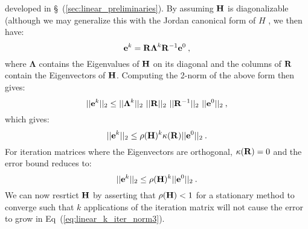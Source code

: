 developed in \S~(\ref{sec:linear_preliminaries}). By assuming $\mathbf{H}$
is diagonalizable (although we may generalize this with the Jordan
canonical form of $H$ \citep{saad_2003}, we then have:
\begin{equation}
  \mathbf{e}^{k} =
  \mathbf{R}\boldsymbol{\Lambda}^k\mathbf{R}^{-1}\mathbf{e}^0\:,
  \label{eq:linear_k_iter_error_diag}
\end{equation}
where $\boldsymbol{\Lambda}$ contains the Eigenvalues of $\mathbf{H}$ on
its diagonal and the columns of $\mathbf{R}$ contain the Eigenvectors of
$\mathbf{H}$. Computing the 2-norm of the above form then gives:
\begin{equation}
  ||\ve{e}^{k}||_2 \leq ||\boldsymbol{\Lambda}^k||_2\ 
  ||\ve{R}||_2\ ||\ve{R}^{-1}||_2\ ||\ve{e}^0||_2\:,
  \label{eq:linear_k_iter_norm1}
\end{equation}
which gives:
\begin{equation}
  ||\mathbf{e}^{k}||_2 \leq \rho(\mathbf{H})^k \kappa(\mathbf{R})
  ||\mathbf{e}^0||_2\:.
  \label{eq:linear_k_iter_norm2}
\end{equation}
For iteration matrices where the Eigenvectors are orthogonal,
$\kappa(\mathbf{R})=0$ and the error bound reduces to:
\begin{equation}
  ||\mathbf{e}^{k}||_2 \leq \rho(\mathbf{H})^k
  ||\mathbf{e}^0||_2\:.
  \label{eq:linear_k_iter_norm3}
\end{equation}
We can now resrtict $\mathbf{H}$ by asserting that $\rho(\mathbf{H}) < 1$
for a stationary method to converge such that $k$ applications of the
iteration matrix will not cause the error to grow in
Eq~(\ref{eq:linear_k_iter_norm3}). 

